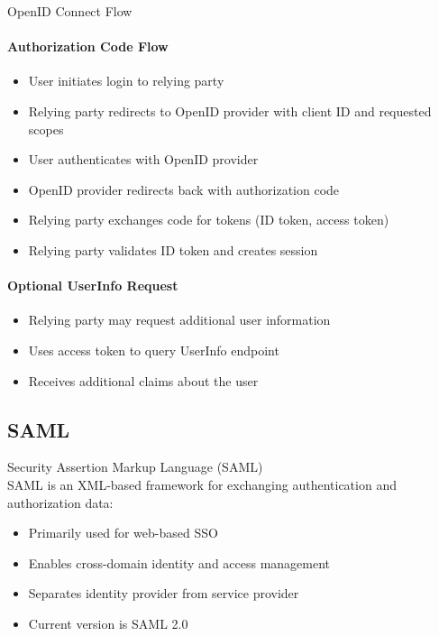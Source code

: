 \begin{KR}{OpenID Connect Flow}\\
\paragraph{Authorization Code Flow}
\begin{itemize}
    \item User initiates login to relying party
    \item Relying party redirects to OpenID provider with client ID and requested scopes
    \item User authenticates with OpenID provider
    \item OpenID provider redirects back with authorization code
    \item Relying party exchanges code for tokens (ID token, access token)
    \item Relying party validates ID token and creates session
\end{itemize}

\paragraph{Optional UserInfo Request}
\begin{itemize}
    \item Relying party may request additional user information
    \item Uses access token to query UserInfo endpoint
    \item Receives additional claims about the user
\end{itemize}
\end{KR}

\subsection{SAML}

\begin{definition}{Security Assertion Markup Language (SAML)}\\
SAML is an XML-based framework for exchanging authentication and authorization data:
\begin{itemize}
    \item Primarily used for web-based SSO
    \item Enables cross-domain identity and access management
    \item Separates identity provider from service provider
    \item Current version is SAML 2.0
\end{itemize}
\end{definition}

